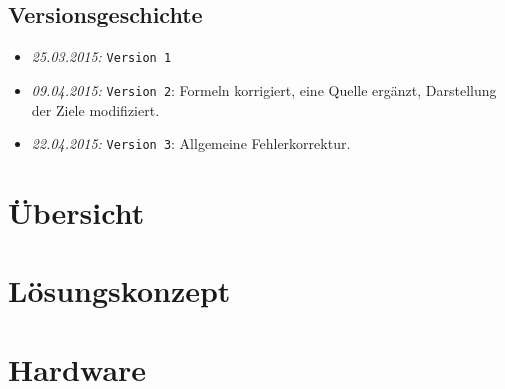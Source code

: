 \documentclass{fhnwreport/fhnwreport}
\begin{document}


\tableofcontents
\vspace{80mm}
\subsection*{Versionsgeschichte}
\begin{itemize}
    \item[]
        \emph{25.03.2015:} \texttt{Version 1}
    \item[]
        \emph{09.04.2015:} \texttt{Version 2}: Formeln korrigiert, eine Quelle erg\"anzt, Darstellung der Ziele modifiziert.
    \item[]
        \emph{22.04.2015:} \texttt{Version 3}: Allgemeine Fehlerkorrektur.
\end{itemize}
\clearpage

\section{\"Ubersicht}
\label{sec:ubersicht}


%

\clearpage
\section{L\"osungskonzept}
\label{sec:losungskonzept}


\clearpage
\section{Hardware}
\label{sec:hardware}

\end{document}
